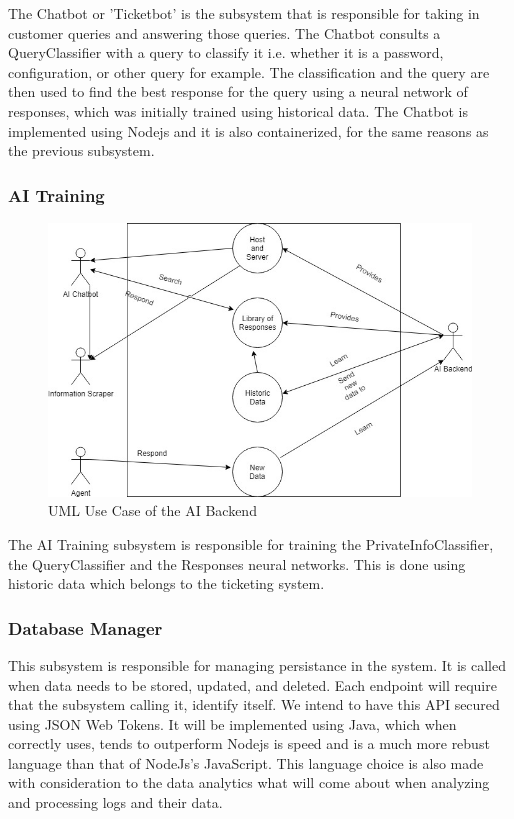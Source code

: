 \documentclass[11pt]{article}
\begin{document}
The Chatbot or 'Ticketbot' is the subsystem that is responsible for taking in customer queries and answering those queries. The Chatbot consults a QueryClassifier with a query to classify it i.e. whether it is a password, configuration, or other query for example. The classification and the query are then used to find the best response for the query using a neural network of responses, which was initially trained using historical data. The Chatbot is implemented using Nodejs and it is also containerized, for the same reasons as the previous subsystem.

\subsubsection{AI Training}

\begin{figure}[H]
	\centering
	\includegraphics[width=1.0\textwidth]{../../images/AI_Backend_UCD.jpg}
	\caption{UML Use Case of the AI Backend}
\end{figure}

The AI Training subsystem is responsible for training the PrivateInfoClassifier, the QueryClassifier and the Responses neural networks. This is done using historic data which belongs to the ticketing system.

\subsubsection{Database Manager}

This subsystem is responsible for managing persistance in the system. It is called when data needs to be stored, updated, and deleted. Each endpoint will require that the subsystem calling it, identify itself. We intend to have this API secured using JSON Web Tokens. It will be implemented using Java, which when correctly uses, tends to outperform Nodejs is speed\cite{Website:2}  and is a much more rebust language than that of NodeJs's JavaScript\cite{Website:2}. This language choice is also made with consideration to the data analytics what will come about when analyzing and processing logs and their data.
\end{document}
